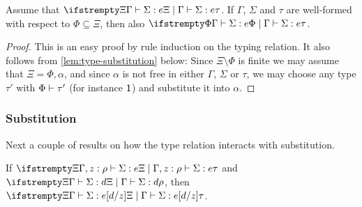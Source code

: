 \begin{lemma}[Strengthening]
    \label{lem:strengthening}
    Assume that $\typerel{\Xi}{\Gamma}{\Sigma}{e}{\tau}$. If $\Gamma$, $\Sigma$ and $\tau$ are well-formed with respect to $\Phi \subseteq \Xi$, then also $\typerel{\Phi}{\Gamma}{\Sigma}{e}{\tau}$.
\end{lemma}

\begin{proof}
    This is an easy proof by rule induction on the typing relation. It also follows from \cref{lem:type-substitution} below: Since $\Xi \setminus \Phi$ is finite we may assume that $\Xi = \Phi, \alpha$, and since $\alpha$ is not free in either $\Gamma$, $\Sigma$ or $\tau$, we may choose any type $\tau'$ with $\Phi \vdash \tau'$ (for instance $\mathsf{1}$) and substitute it into $\alpha$.
\end{proof}


\subsubsection{Substitution}

Next a couple of results on how the type relation interacts with substitution.

\begin{lemma}
    \label{lem:substitution-type-preservation}
    If $\typerel{\Xi}{\Gamma, \hastype{z}{\rho}}{\Sigma}{e}{\tau}$ and $\typerel{\Xi}{\Gamma}{\Sigma}{d}{\rho}$, then $\typerel{\Xi}{\Gamma}{\Sigma}{e[d/z]}{\tau}$.
\end{lemma}

